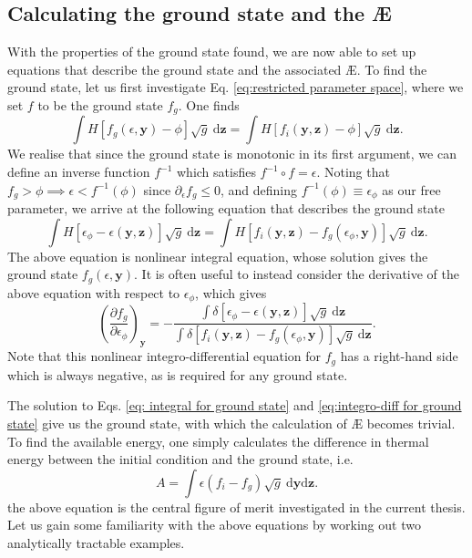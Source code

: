 \subsection{Calculating the ground state and the \AE{}}
With the properties of the ground state found, we are now able to set up equations that describe the ground state and the associated \AE{}. To find the ground state, let us first investigate Eq. \eqref{eq:restricted parameter space}, where we set $f$ to be the ground state $f_g$. One finds
\begin{equation}
    \int H[f_g(\epsilon,\boldsymbol{y}) - \phi] \sqrt{g} \: \mathrm{d} \boldsymbol{z} = \int H[f_i(\boldsymbol{y},\boldsymbol{z}) - \phi] \sqrt{g} \: \mathrm{d} \boldsymbol{z}.
\end{equation}
We realise that since the ground state is monotonic in its first argument, we can define an inverse function $f^{-1}$ which satisfies $f^{-1} \circ f =\epsilon$. Noting that $f_g > \phi \implies \epsilon < f^{-1}(\phi)$ since $\partial_\epsilon f_g \leq 0$, and defining $f^{-1}(\phi)\equiv \epsilon_\phi$ as our free parameter, we arrive at the following equation that describes the ground state
\begin{equation}
    \int H[\epsilon_\phi - \epsilon(\boldsymbol{y},\boldsymbol{z})] \sqrt{g} \: \mathrm{d} \boldsymbol{z} = \int H[f_i(\boldsymbol{y},\boldsymbol{z}) - f_g(\epsilon_\phi,\boldsymbol{y})] \sqrt{g} \: \mathrm{d} \boldsymbol{z}.
    \label{eq: integral for ground state}
\end{equation}
The above equation is nonlinear integral equation, whose solution gives the ground state $f_g(\epsilon,\boldsymbol{y})$. It is often useful to instead consider the derivative of the above equation with respect to $\epsilon_\phi$, which gives
\begin{equation}
    \left( \frac{\partial f_g}{\partial \epsilon_\phi} \right)_{\boldsymbol{y}} = - \frac{\int \delta[\epsilon_\phi - \epsilon(\boldsymbol{y},\boldsymbol{z})] \sqrt{g} \: \mathrm{d} \boldsymbol{z}}{\int \delta[f_i(\boldsymbol{y},\boldsymbol{z}) - f_g(\epsilon_\phi,\boldsymbol{y})] \sqrt{g} \: \mathrm{d} \boldsymbol{z}}.
    \label{eq:integro-diff for ground state}
\end{equation}
Note that this nonlinear integro-differential equation for $f_g$ has a right-hand side which is always negative, as is required for any ground state. \par 
The solution to Eqs. \eqref{eq: integral for ground state} and \eqref{eq:integro-diff for ground state} give us the ground state, with which the calculation of \AE{} becomes trivial. To find the available energy, one simply calculates the difference in thermal energy between the initial condition and the ground state, i.e. 
\begin{equation}
    A = \int \epsilon \left( f_i - f_g \right) \sqrt{g} \: \mathrm{d}\boldsymbol{y} \mathrm{d}\boldsymbol{z}.
    \label{eq: available energy central equation}
\end{equation}
the above equation is the central figure of merit investigated in the current thesis. Let us gain some familiarity with the above equations by working out two analytically tractable examples.

